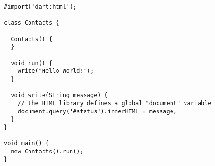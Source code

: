 \documentclass[a4paper,12pt]{article}
\begin{document}
\begin{lstlisting}
#import('dart:html');

class Contacts {

  Contacts() {
  }

  void run() {
    write("Hello World!");
  }

  void write(String message) {
    // the HTML library defines a global "document" variable
    document.query('#status').innerHTML = message;
  }
}

void main() {
  new Contacts().run();
}
\end{lstlisting}
\end{document}
